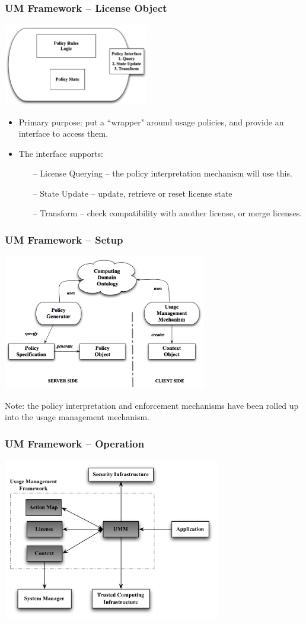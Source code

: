 \documentclass[t,handout, 10pt]{beamer}
\begin{document}
\begin{frame}\frametitle{UM Framework -- License Object}
  \centerline{\includegraphics[width=2.5in]{policy-obj.png}}
   \begin{itemize}
   \item Primary purpose: put a ``wrapper" around usage policies, and provide an interface to access them.
   \pause
   \item The interface supports:
    \begin{itemize}
    \item[--] License Querying -- the policy interpretation mechanism will use this.
    \item[--] State Update -- update, retrieve or reset license state
    \item[--] Transform -- check compatibility with another license, or merge licenses.
    \end{itemize}
   \end{itemize}
\end{frame}

\begin{frame}\frametitle{UM Framework -- Setup}
  \centerline{\includegraphics[width=3.5in]{UM-setup.png}}
    {\small Note: the policy interpretation and enforcement mechanisms have been rolled up into the usage management mechanism.}
\end{frame}  
  
\begin{frame}\frametitle{UM Framework -- Operation}
  \centerline{\includegraphics[width=3.75in]{UM-operation.png}}
\end{frame}  
\end{document}
